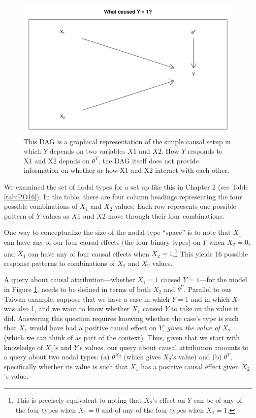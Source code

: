 \documentclass[
  12pt,
]{book}
\begin{document}
\begin{figure}

{\centering \includegraphics[width=0.6\linewidth]{ii_files/figure-latex/attribquery-1} 

}

\caption{\label{fig:attribquery} This DAG is a graphical representation of the simple causal setup in which $Y$ depends on two variables $X1$ and $X2$. How $Y$ responds to X1 and X2 depnds on $\theta^Y$, the DAG itself does not provide information on whether or how X1 and X2 interact with each other.}\label{fig:attribquery}
\end{figure}

We examined the set of nodal types for a set up like this in Chapter 2 (see Table \ref{tab:PO16}). In the table, there are four column headings representing the four possible combinations of \(X_1\) and \(X_2\) values. Each row represents one possible pattern of \(Y\) values as \(X1\) and \(X2\) move through their four combinations.

One way to conceptualize the size of the nodal-type ``space'' is to note that \(X_1\) can have any of our four causal effects (the four binary types) on \(Y\) when \(X_2=0\); and \(X_1\) can have any of four causal effects when \(X_2=1\).\footnote{This is precisely equivalent to noting that \(X_2\)'s effect on \(Y\) can be of any of the four types when \(X_1=0\) and of any of the four types when \(X_1=1\).} This yields 16 possible response patterns to combinations of \(X_1\) and \(X_2\) values.

A query about causal attribution---whether \(X_1 = 1\) caused \(Y=1\)---for the model in Figure \ref{fig:attribquery}, needs to be defined in terms of both \(X_2\) and \(\theta^Y\). Parallel to our Taiwan example, suppose that we have a case in which \(Y=1\) and in which \(X_1\) was also 1, and we want to know whether \(X_1\) caused \(Y\) to take on the value it did. Answering this question requires knowing whether the case's type is such that \(X_1\) would have had a positive causal effect on \(Y\), \emph{given the value of \(X_2\)} (which we can think of as part of the context). Thus, given that we start with knowledge of \(X_1\)'s and \(Y\)'s values, our query about causal attribution amounts to a query about two nodal types: (a) \(\theta^{X_2}\) (which gives \(X_2\)'s value) and (b) \(\theta^Y\), specifically whether its value is such that \(X_1\) has a positive causal effect given \(X_2\)'s value.
\end{document}
